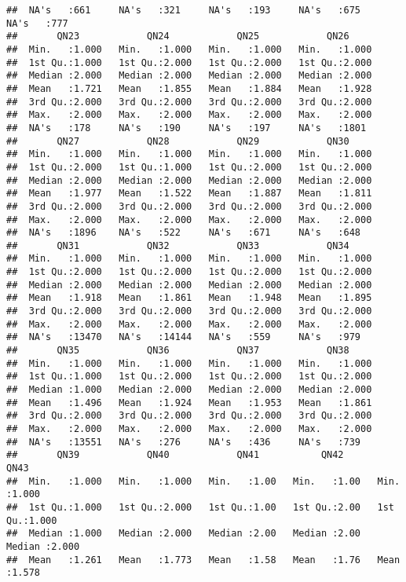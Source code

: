\documentclass[
]{article}
\begin{document}
\begin{verbatim}
##  NA's   :661     NA's   :321     NA's   :193     NA's   :675     NA's   :777   
##       QN23            QN24            QN25            QN26      
##  Min.   :1.000   Min.   :1.000   Min.   :1.000   Min.   :1.000  
##  1st Qu.:1.000   1st Qu.:2.000   1st Qu.:2.000   1st Qu.:2.000  
##  Median :2.000   Median :2.000   Median :2.000   Median :2.000  
##  Mean   :1.721   Mean   :1.855   Mean   :1.884   Mean   :1.928  
##  3rd Qu.:2.000   3rd Qu.:2.000   3rd Qu.:2.000   3rd Qu.:2.000  
##  Max.   :2.000   Max.   :2.000   Max.   :2.000   Max.   :2.000  
##  NA's   :178     NA's   :190     NA's   :197     NA's   :1801   
##       QN27            QN28            QN29            QN30      
##  Min.   :1.000   Min.   :1.000   Min.   :1.000   Min.   :1.000  
##  1st Qu.:2.000   1st Qu.:1.000   1st Qu.:2.000   1st Qu.:2.000  
##  Median :2.000   Median :2.000   Median :2.000   Median :2.000  
##  Mean   :1.977   Mean   :1.522   Mean   :1.887   Mean   :1.811  
##  3rd Qu.:2.000   3rd Qu.:2.000   3rd Qu.:2.000   3rd Qu.:2.000  
##  Max.   :2.000   Max.   :2.000   Max.   :2.000   Max.   :2.000  
##  NA's   :1896    NA's   :522     NA's   :671     NA's   :648    
##       QN31            QN32            QN33            QN34      
##  Min.   :1.000   Min.   :1.000   Min.   :1.000   Min.   :1.000  
##  1st Qu.:2.000   1st Qu.:2.000   1st Qu.:2.000   1st Qu.:2.000  
##  Median :2.000   Median :2.000   Median :2.000   Median :2.000  
##  Mean   :1.918   Mean   :1.861   Mean   :1.948   Mean   :1.895  
##  3rd Qu.:2.000   3rd Qu.:2.000   3rd Qu.:2.000   3rd Qu.:2.000  
##  Max.   :2.000   Max.   :2.000   Max.   :2.000   Max.   :2.000  
##  NA's   :13470   NA's   :14144   NA's   :559     NA's   :979    
##       QN35            QN36            QN37            QN38      
##  Min.   :1.000   Min.   :1.000   Min.   :1.000   Min.   :1.000  
##  1st Qu.:1.000   1st Qu.:2.000   1st Qu.:2.000   1st Qu.:2.000  
##  Median :1.000   Median :2.000   Median :2.000   Median :2.000  
##  Mean   :1.496   Mean   :1.924   Mean   :1.953   Mean   :1.861  
##  3rd Qu.:2.000   3rd Qu.:2.000   3rd Qu.:2.000   3rd Qu.:2.000  
##  Max.   :2.000   Max.   :2.000   Max.   :2.000   Max.   :2.000  
##  NA's   :13551   NA's   :276     NA's   :436     NA's   :739    
##       QN39            QN40            QN41           QN42           QN43      
##  Min.   :1.000   Min.   :1.000   Min.   :1.00   Min.   :1.00   Min.   :1.000  
##  1st Qu.:1.000   1st Qu.:2.000   1st Qu.:1.00   1st Qu.:2.00   1st Qu.:1.000  
##  Median :1.000   Median :2.000   Median :2.00   Median :2.00   Median :2.000  
##  Mean   :1.261   Mean   :1.773   Mean   :1.58   Mean   :1.76   Mean   :1.578  

\end{verbatim}
\end{document}
